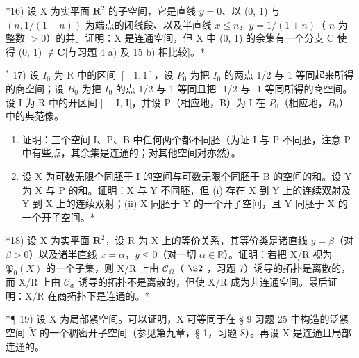 *16) 设 X 为实平面 \(\mathbf{R}^2\) 的子空间，它是直线 \(y = 0\)、以 (0, 1) 与 \((n, 1/(1 + n))\) 为端点的闭线段、以及半直线 \(x \leqslant n\)，\(y = 1/(1 + n)\)（ \(n\) 为整数 \(>0\)）的并。证明：X 是连通空间，但 X 中 (0, 1) 的余集有一个分支 C 使得 (0, 1) \(\notin \overline{\mathbf{C}}\){[}与习题 4 a) 及 15 b) 相比较{]}。*

\(^{*}\) 17) 设 \(I_{0}\) 为 R 中的区间 \([-1,1]\)，设 \(P_{0}\) 为把 \(I_{0}\) 的两点 1/2 与 1 等同起来所得的商空间；设 \(B_{0}\) 为把 \(I_{0}\) 的点 1/2 与 1 等同且把 -1/2 与 -1 等同所得的商空间。设 I 为 R 中的开区间 {]}--- I, I{[}，并设 P（相应地，B）为 I 在 \(P_{0}\)（相应地，\(B_{0}\)）中的典范像。

\begin{enumerate}
\def\labelenumi{\alph{enumi})}
\item
  证明：三个空间 I、P、B 中任何两个都不同胚（为证 I 与 P 不同胚，注意 P 中有些点，其余集是连通的；对其他空间对亦然）。
\item
  设 X 为可数无限个同胚于 I 的空间与可数无限个同胚于 B 的空间的和。设 Y 为 X 与 P 的和。证明：X 与 Y 不同胚，但 (i) 存在 X 到 Y 上的连续双射及 Y 到 X 上的连续双射；(ii) X 同胚于 Y 的一个开子空间，且 Y 同胚于 X 的一个开子空间。*
\end{enumerate}

*18) 设 X 为实平面 \(\mathbf{R}^2\)，设 R 为 X 上的等价关系，其等价类是诸直线 \(y = \beta\)（对 \(\beta > 0\)）以及诸半直线 \(x = \alpha\)，\(y \leqslant 0\)（对一切 \(\alpha \in \mathbb{R}\)）。证明：若把 X/R 视为 \(\mathfrak{P}_0(X)\) 的一个子集，则 X/R 上由 \(\mathcal{C}_{\Omega}\)（ \(\S 2\) ，习题 7）诱导的拓扑是离散的，而 X/R 上由 \(\mathcal{C}_{\Phi}\) 诱导的拓扑不是离散的，但使 X/R 成为非连通空间。最后证明：X/R 在商拓扑下是连通的。*

*¶ 19) 设 X 为局部紧空间。可以证明，X 可等同于在 § 9 习题 25 中构造的泛紧空间 \(\tilde{X}\) 的一个稠密开子空间（参见第九章，§ 1，习题 8）。再设 X 是连通且局部连通的。

